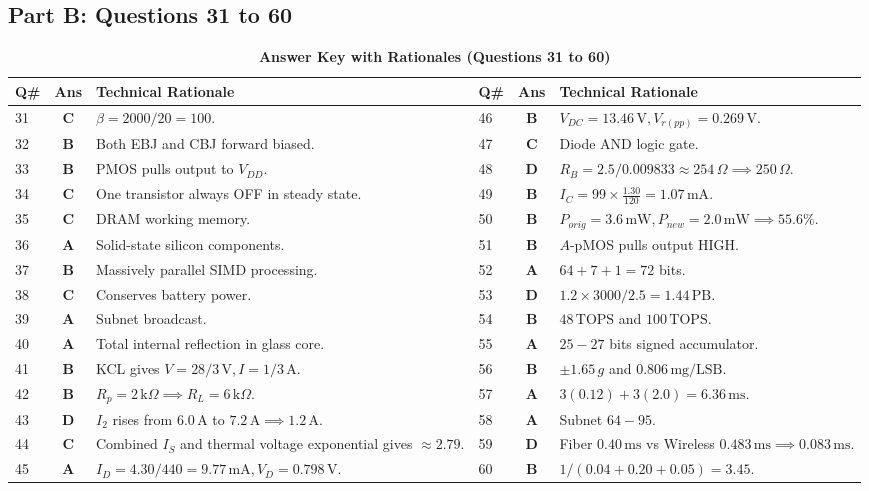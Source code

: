 \subsection*{Part B: Questions 31 to 60}
\begin{table}[htbp]
\centering
\caption{\textbf{Answer Key with Rationales (Questions 31 to 60)}}
\vspace{2mm}
\small
\begin{tabularx}{\textwidth}{l c X l c X}
\toprule
\textbf{Q\#} & \textbf{Ans} & \textbf{Technical Rationale} & \textbf{Q\#} & \textbf{Ans} & \textbf{Technical Rationale} \\
\midrule
31 & \textbf{C} & $\beta = 2000/20 = 100$. & 46 & \textbf{B} & $V_{DC} = 13.46\,\text{V}, V_{r(pp)} = 0.269\,\text{V}$. \\
32 & \textbf{B} & Both EBJ and CBJ forward biased. & 47 & \textbf{C} & Diode AND logic gate. \\
33 & \textbf{B} & PMOS pulls output to $V_{DD}$. & 48 & \textbf{D} & $R_B = 2.5 / 0.009833 \approx 254\,\Omega \implies 250\,\Omega$. \\
34 & \textbf{C} & One transistor always OFF in steady state. & 49 & \textbf{B} & $I_C = 99 \times \frac{1.30}{120} = 1.07\,\text{mA}$. \\
35 & \textbf{C} & DRAM working memory. & 50 & \textbf{B} & $P_{orig} = 3.6\,\text{mW}, P_{new} = 2.0\,\text{mW} \implies 55.6\%$. \\
36 & \textbf{A} & Solid-state silicon components. & 51 & \textbf{B} & $A$-pMOS pulls output HIGH. \\
37 & \textbf{B} & Massively parallel SIMD processing. & 52 & \textbf{A} & $64 + 7 + 1 = 72$ bits. \\
38 & \textbf{C} & Conserves battery power. & 53 & \textbf{D} & $1.2 \times 3000 / 2.5 = 1.44\,\text{PB}$. \\
39 & \textbf{A} & Subnet broadcast. & 54 & \textbf{B} & $48\,\text{TOPS}$ and $100\,\text{TOPS}$. \\
40 & \textbf{A} & Total internal reflection in glass core. & 55 & \textbf{A} & $25-27$ bits signed accumulator. \\
41 & \textbf{B} & KCL gives $V = 28/3\,\text{V}, I = 1/3\,\text{A}$. & 56 & \textbf{B} & $\pm 1.65\,g$ and $0.806\,\text{mg/LSB}$. \\
42 & \textbf{B} & $R_p = 2\,\text{k}\Omega \implies R_L = 6\,\text{k}\Omega$. & 57 & \textbf{A} & $3(0.12) + 3(2.0) = 6.36\,\text{ms}$. \\
43 & \textbf{D} & $I_2$ rises from $6.0\,\text{A}$ to $7.2\,\text{A} \implies 1.2\,\text{A}$. & 58 & \textbf{A} & Subnet $64-95$. \\
44 & \textbf{C} & Combined $I_S$ and thermal voltage exponential gives $\approx 2.79$. & 59 & \textbf{D} & Fiber $0.40\,\text{ms}$ vs Wireless $0.483\,\text{ms} \implies 0.083\,\text{ms}$. \\
45 & \textbf{A} & $I_D = 4.30/440 = 9.77\,\text{mA}, V_D = 0.798\,\text{V}$. & 60 & \textbf{B} & $1 / (0.04 + 0.20 + 0.05) = 3.45$. \\
\bottomrule
\end{tabularx}
\end{table}

